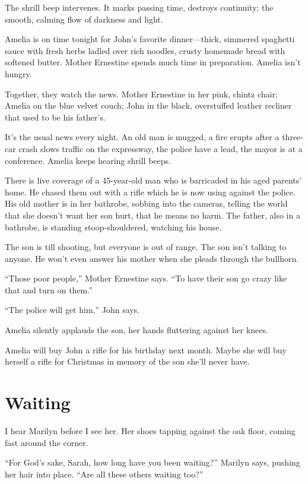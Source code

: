 \documentclass[twoside,10pt]{book}
\begin{document}
The shrill beep intervenes. It marks passing time, destroys continuity;
the smooth, calming flow of darkness and light.

Amelia is on time tonight for John's favorite dinner---thick, simmered
spaghetti sauce with fresh herbs ladled over rich noodles, crusty
homemade bread with softened butter. Mother Ernestine spends much time
in preparation. Amelia isn't hungry.

Together, they watch the news. Mother Ernestine in her pink, chintz
chair; Amelia on the blue velvet couch; John in the black, overstuffed
leather recliner that used to be his father's.

It's the usual news every night. An old man is mugged, a fire erupts
after a three-car crash slows traffic on the expressway, the police have
a lead, the mayor is at a conference. Amelia keeps hearing shrill beeps.

There is live coverage of a 45-year-old man who is barricaded in his
aged parents' home. He chased them out with a rifle which he is now
using against the police. His old mother is in her bath­robe, sobbing
into the cameras, telling the world that she doesn't want her son hurt,
that he means no harm. The father, also in a bathrobe, is standing
stoop-shouldered, watching his house.

The son is till shooting, but everyone is out of range. The son isn't
talking to anyone. He won't even answer his mother when she pleads
through the bullhorn.

``Those poor people,'' Mother Ernestine says. ``To have their son go
crazy like that and turn on them.''

``The police will get him,'' John says.

Amelia silently applauds the son, her hands fluttering against her
knees.

Amelia will buy John a rifle for his birthday next month. Maybe she will
buy herself a rifle for Christmas in memory of the son she'll never
have.


\cleardoublepage
\chapter{Waiting}

I hear Marilyn before I see her. Her shoes tapping against the oak
floor, coming fast around the corner.

``For God's sake, Sarah, how long have you been waiting?'' Marilyn says,
pushing her hair into place. ``Are all these others waiting too?''
\end{document}
